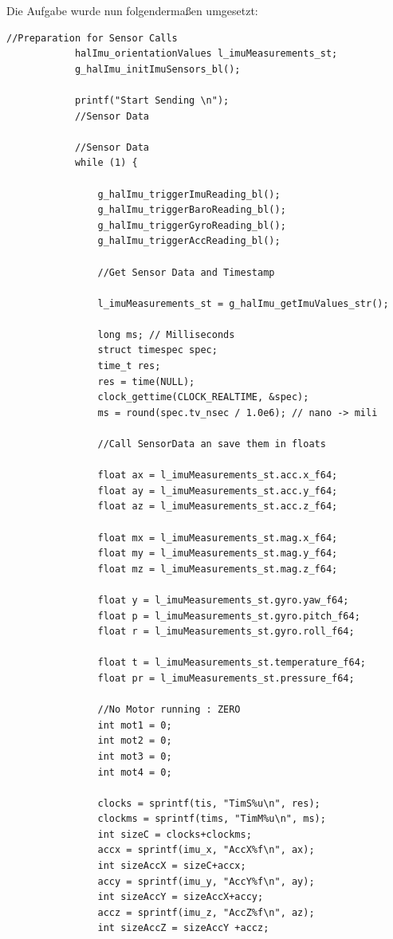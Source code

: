 \documentclass{article}
\begin{document}
\begin{enumerate}
Die Aufgabe wurde nun folgendermaßen umgesetzt:\\

\begin{verbatim}
//Preparation for Sensor Calls
            halImu_orientationValues l_imuMeasurements_st;
            g_halImu_initImuSensors_bl();

            printf("Start Sending \n");
            //Sensor Data

            //Sensor Data
            while (1) {

                g_halImu_triggerImuReading_bl();
                g_halImu_triggerBaroReading_bl();
                g_halImu_triggerGyroReading_bl();
                g_halImu_triggerAccReading_bl();

                //Get Sensor Data and Timestamp

                l_imuMeasurements_st = g_halImu_getImuValues_str();

                long ms; // Milliseconds
                struct timespec spec;
                time_t res;
                res = time(NULL);
                clock_gettime(CLOCK_REALTIME, &spec);
                ms = round(spec.tv_nsec / 1.0e6); // nano -> mili

                //Call SensorData an save them in floats

                float ax = l_imuMeasurements_st.acc.x_f64;
                float ay = l_imuMeasurements_st.acc.y_f64;
                float az = l_imuMeasurements_st.acc.z_f64;

                float mx = l_imuMeasurements_st.mag.x_f64;
                float my = l_imuMeasurements_st.mag.y_f64;
                float mz = l_imuMeasurements_st.mag.z_f64;

                float y = l_imuMeasurements_st.gyro.yaw_f64;
                float p = l_imuMeasurements_st.gyro.pitch_f64;
                float r = l_imuMeasurements_st.gyro.roll_f64;

                float t = l_imuMeasurements_st.temperature_f64;
                float pr = l_imuMeasurements_st.pressure_f64;

                //No Motor running : ZERO
                int mot1 = 0;
                int mot2 = 0;
                int mot3 = 0;
                int mot4 = 0;

                clocks = sprintf(tis, "TimS%u\n", res);
                clockms = sprintf(tims, "TimM%u\n", ms);
                int sizeC = clocks+clockms;
                accx = sprintf(imu_x, "AccX%f\n", ax);
                int sizeAccX = sizeC+accx;
                accy = sprintf(imu_y, "AccY%f\n", ay);
                int sizeAccY = sizeAccX+accy;
                accz = sprintf(imu_z, "AccZ%f\n", az);
                int sizeAccZ = sizeAccY +accz;


\end{verbatim}
\end{enumerate}
\end{document}
